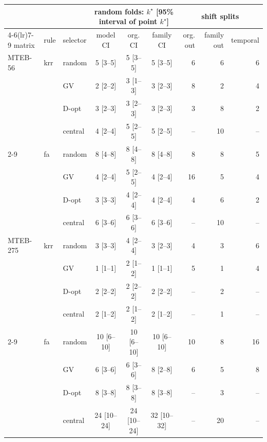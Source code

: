 \begin{tabular}{lllcccrrr}
\toprule
 & & & \multicolumn{3}{c}{random folds: $k^\star$ [95\% interval of point $k^\star$]} & \multicolumn{3}{c}{shift splits} \\
\cmidrule(lr){4-6}\cmidrule(lr){7-9}
matrix & rule & selector & model CI & org. CI & family CI & org. out & family out & temporal \\
\midrule
MTEB-56 & krr & random & 5 {\scriptsize[3--5]} & 5 {\scriptsize[3--5]} & 5 {\scriptsize[3--5]} & 6 & 6 & 6 \\
 &  & GV & 2 {\scriptsize[2--2]} & 3 {\scriptsize[1--3]} & 3 {\scriptsize[2--3]} & 8 & 2 & 4 \\
 &  & D-opt & 3 {\scriptsize[2--3]} & 3 {\scriptsize[2--3]} & 3 {\scriptsize[2--3]} & 3 & 8 & 2 \\
 &  & central & 4 {\scriptsize[2--4]} & 5 {\scriptsize[2--5]} & 5 {\scriptsize[2--5]} & -- & 10 & -- \\
\cmidrule(lr){2-9}
 & fa & random & 8 {\scriptsize[4--8]} & 8 {\scriptsize[4--8]} & 8 {\scriptsize[4--8]} & 8 & 8 & 5 \\
 &  & GV & 4 {\scriptsize[2--4]} & 5 {\scriptsize[2--5]} & 4 {\scriptsize[2--4]} & 16 & 5 & 4 \\
 &  & D-opt & 3 {\scriptsize[3--3]} & 4 {\scriptsize[2--4]} & 4 {\scriptsize[2--4]} & 4 & 6 & 2 \\
 &  & central & 6 {\scriptsize[3--6]} & 6 {\scriptsize[3--6]} & 6 {\scriptsize[3--6]} & -- & 10 & -- \\
\midrule
MTEB-275 & krr & random & 3 {\scriptsize[3--3]} & 4 {\scriptsize[2--4]} & 3 {\scriptsize[2--3]} & 4 & 3 & 6 \\
 &  & GV & 1 {\scriptsize[1--1]} & 2 {\scriptsize[1--2]} & 1 {\scriptsize[1--1]} & 5 & 1 & 4 \\
 &  & D-opt & 2 {\scriptsize[2--2]} & 2 {\scriptsize[2--2]} & 2 {\scriptsize[2--2]} & -- & 2 & -- \\
 &  & central & 2 {\scriptsize[1--2]} & 2 {\scriptsize[1--2]} & 2 {\scriptsize[1--2]} & -- & 1 & -- \\
\cmidrule(lr){2-9}
 & fa & random & 10 {\scriptsize[6--10]} & 10 {\scriptsize[6--10]} & 10 {\scriptsize[6--10]} & 10 & 8 & 16 \\
 &  & GV & 6 {\scriptsize[3--6]} & 6 {\scriptsize[3--6]} & 8 {\scriptsize[2--8]} & 6 & 5 & 8 \\
 &  & D-opt & 8 {\scriptsize[3--8]} & 8 {\scriptsize[3--8]} & 8 {\scriptsize[3--8]} & -- & 3 & -- \\
 &  & central & 24 {\scriptsize[10--24]} & 24 {\scriptsize[10--24]} & 32 {\scriptsize[10--32]} & -- & 20 & -- \\

\end{tabular}
